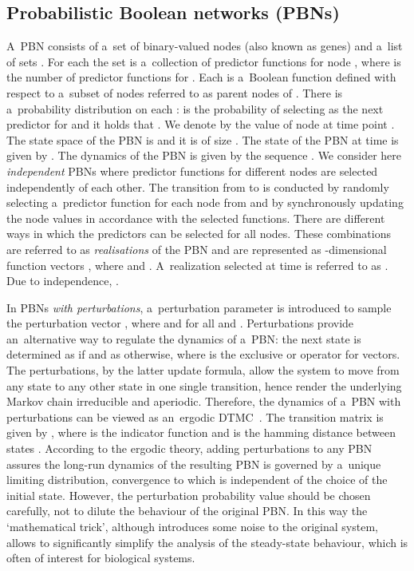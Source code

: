 \documentclass[runningheads,a4paper]{llncs}
\begin{document}
\subsection{Probabilistic Boolean networks (PBNs)}
\label{ssec:pbn}
A~PBN  consists of a~set of binary-valued nodes (also known as genes)
 and a~list of sets .
For each  the set
 is a~collection of predictor functions
for node , where  is the number of predictor functions for . Each  is a~Boolean function defined with respect to a~subset of nodes referred to as parent
nodes of . There is a~probability distribution on each :  is the
probability of selecting  as the next predictor for  and it holds that
. We denote by  the value of node  at time point
. The state space of the PBN is  and it is of size . The state
of the PBN at time  is given by . The
dynamics of the PBN is given by the sequence . We consider here
\emph{independent} PBNs where predictor functions for different nodes are selected independently
of each other. The transition from  to  is conducted by
randomly selecting a~predictor function for each node  from  and by synchronously
updating the node values in accordance with the selected functions. There are
 different ways in which the predictors can be selected for all  nodes.
These combinations are referred to as \emph{realisations} of the PBN and are represented as
-dimensional function vectors ,
where  and . A~realization selected at time
 is referred to as . Due to independence, .

In PBNs \emph{with perturbations}, a~perturbation parameter  is introduced to sample
the perturbation vector
, where  and  for all  and .
Perturbations provide an~alternative way to regulate the dynamics of a~PBN: the next state is
determined as  if
 and as  otherwise, where  is the exclusive or operator for vectors. The
perturbations, by the latter update formula, allow the system to move from any state to any other
state in one single transition, hence render the underlying Markov chain irreducible and
aperiodic. Therefore, the dynamics of a~PBN with perturbations can be viewed as an~ergodic
DTMC~\cite{SD10}. The transition matrix is given by
, where
 is the indicator function and  is the hamming distance between states
.
According to the ergodic theory, adding perturbations to any PBN assures the long-run dynamics of
the resulting PBN is governed by a~unique limiting distribution, convergence to which is
independent of the choice of the initial state. However, the perturbation probability value should
be chosen carefully, not to dilute the behaviour of the original PBN. In this way the
`mathematical trick', although introduces some noise to the original system, allows to
significantly simplify the analysis of the steady-state behaviour, which is often of interest for
biological systems.
\end{document}
